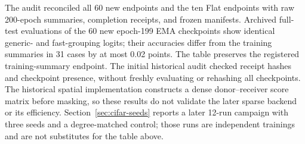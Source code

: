 The audit reconciled all 60 new endpoints and the ten Flat endpoints with raw 200-epoch summaries, completion receipts, and frozen manifests.
Archived full-test evaluations of the 60 new epoch-199 EMA checkpoints show identical generic- and fast-grouping logits; their accuracies differ from the training summaries in 31 cases by at most 0.02 points.
The table preserves the registered training-summary endpoint.
The initial historical audit checked receipt hashes and checkpoint presence, without freshly evaluating or rehashing all checkpoints.
The historical spatial implementation constructs a dense donor--receiver score matrix before masking, so these results do not validate the later sparse backend or its efficiency.
Section~\ref{sec:cifar-seeds} reports a later 12-run campaign with three seeds and a degree-matched control; those runs are independent trainings and are not substitutes for the table above.
